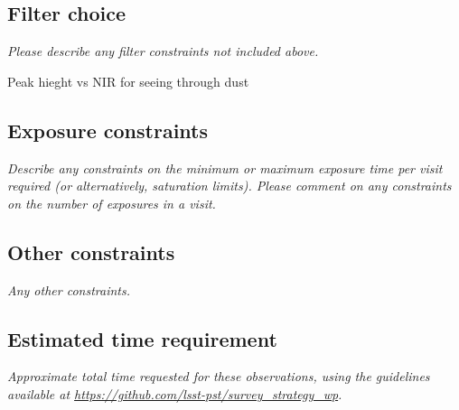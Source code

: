 \documentclass[11pt]{article}
\begin{document}
\subsection{Filter choice}
\begin{footnotesize}
{\it Please describe any filter constraints not included above.}
\end{footnotesize}

Peak hieght vs NIR for seeing through dust

\subsection{Exposure constraints}
\begin{footnotesize}
{\it Describe any constraints on the minimum or maximum exposure time per visit required (or alternatively, saturation limits).
Please comment on any constraints on the number of exposures in a visit.}
\end{footnotesize}

\subsection{Other constraints}
\begin{footnotesize}
{\it Any other constraints.}
\end{footnotesize}

\subsection{Estimated time requirement}
\begin{footnotesize}
{\it Approximate total time requested for these observations, using the guidelines available at \url{https://github.com/lsst-pst/survey_strategy_wp}.}
\end{footnotesize}

\vspace{.3in}
\end{document}
